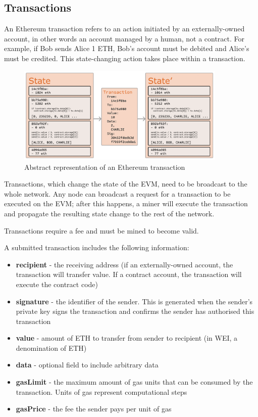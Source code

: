 \subsection{Transactions}
An Ethereum transaction refers to an action initiated by an externally-owned account, in other words an account managed by a human, not a contract. For example, if Bob sends Alice 1 ETH, Bob's account must be debited and Alice's must be credited\cite{ethereumcommunityEthereumDevelopmentDocumentation}. This state-changing action takes place within a transaction.

\begin{figure}[H]
	\centering
		\includegraphics[width=10cm]{images/chapter2/transition.png}
		\caption{{\footnotesize Abstract representation of an Ethereum transaction}}
\end{figure}

Transactions, which change the state of the EVM, need to be broadcast to the whole network. Any node can broadcast a request for a transaction to be executed on the EVM; after this happens, a miner will execute the transaction and propagate the resulting state change to the rest of the network\cite{ethereumcommunityEthereumDevelopmentDocumentation}.

Transactions require a fee and must be mined to become valid.

A submitted transaction includes the following information:

\begin{itemize}
\item \textbf{recipient} - the receiving address (if an externally-owned account, the transaction will transfer value. If a contract account, the transaction will execute the contract code)
\item \textbf{signature} - the identifier of the sender. This is generated when the sender's private key signs the transaction and confirms the sender has authorised this transaction
\item \textbf{value} - amount of ETH to transfer from sender to recipient (in WEI, a denomination of ETH)
\item \textbf{data} - optional field to include arbitrary data
\item \textbf{gasLimit} - the maximum amount of gas units that can be consumed by the transaction. Units of gas represent computational steps
\item \textbf{gasPrice} - the fee the sender pays per unit of gas
\end{itemize}

